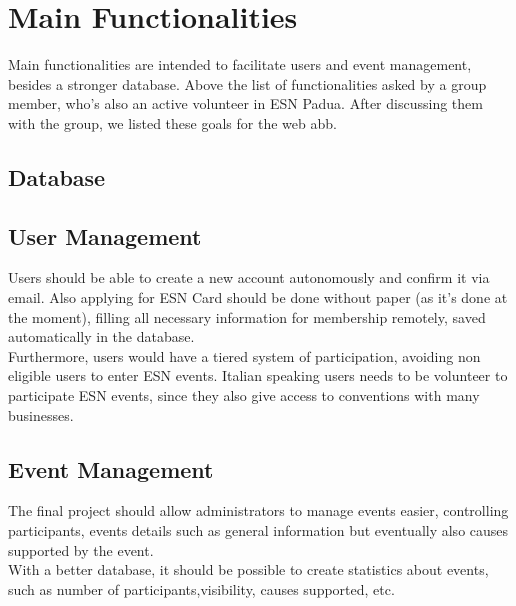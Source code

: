 \section{Main Functionalities}

Main functionalities are intended to facilitate users and event management, besides a stronger database.
Above the list of functionalities asked by a group member, who's also an active volunteer in ESN Padua.
After discussing them  with the group, we listed these goals for the web abb.

\subsection{Database}
\lipsum[1]
\subsection{User Management}
Users should be able to create a new account autonomously and confirm it via email. Also
applying for ESN Card should be done without paper (as it's done at the moment), filling all necessary
information for membership remotely, saved automatically in the database.\\
Furthermore, users would have a tiered system of participation, avoiding non eligible users to enter ESN events. Italian
speaking users needs to be volunteer to participate ESN events, since they also give access to conventions with many businesses.\\

\subsection{Event Management}
The final project should allow administrators to manage events easier, controlling participants, events
details such as general information but eventually also causes supported by the event.\\
With a better database, it should be possible to create statistics about events,
such as number of participants,visibility, causes supported, etc.\\